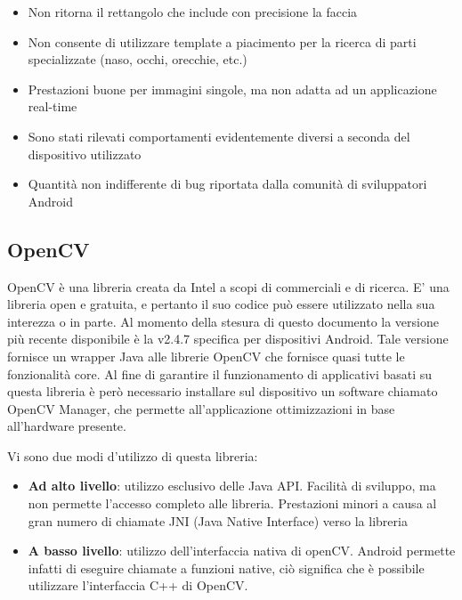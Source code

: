 \begin{itemize}
\item Non ritorna il rettangolo che include con precisione la faccia

\item Non consente di utilizzare template a piacimento per la ricerca di parti specializzate (naso, occhi, orecchie, etc.)

\item Prestazioni buone per immagini singole, ma non adatta ad un applicazione real-time

\item Sono stati rilevati comportamenti evidentemente diversi a seconda del dispositivo utilizzato

\item Quantità non indifferente di bug riportata dalla comunità di sviluppatori Android
\end{itemize}

\subsection{OpenCV}

OpenCV è una libreria creata da Intel a scopi di commerciali e di ricerca. E' una libreria open e gratuita, e pertanto il suo codice può essere utilizzato nella sua interezza o in parte. Al momento della stesura di questo documento la versione più recente disponibile è la v2.4.7 specifica per dispositivi Android. Tale versione fornisce un wrapper Java alle librerie OpenCV che fornisce quasi tutte le fonzionalità core. Al fine di garantire il funzionamento di applicativi basati su questa libreria è però necessario installare sul dispositivo un software chiamato OpenCV Manager, che permette all'applicazione ottimizzazioni in base all'hardware presente.

Vi sono due modi d'utilizzo di questa libreria:

\begin{itemize}
\item \textbf{Ad alto livello}:  utilizzo esclusivo delle Java API. Facilità di sviluppo, ma non permette l'accesso completo alle libreria. Prestazioni minori a causa al gran numero di chiamate JNI (Java Native Interface) verso la libreria

\item \textbf{A basso livello}:  utilizzo dell'interfaccia nativa di openCV. Android permette infatti di eseguire chiamate a funzioni native, ciò significa che è possibile utilizzare l'interfaccia C++ di OpenCV. 
\end{itemize}
